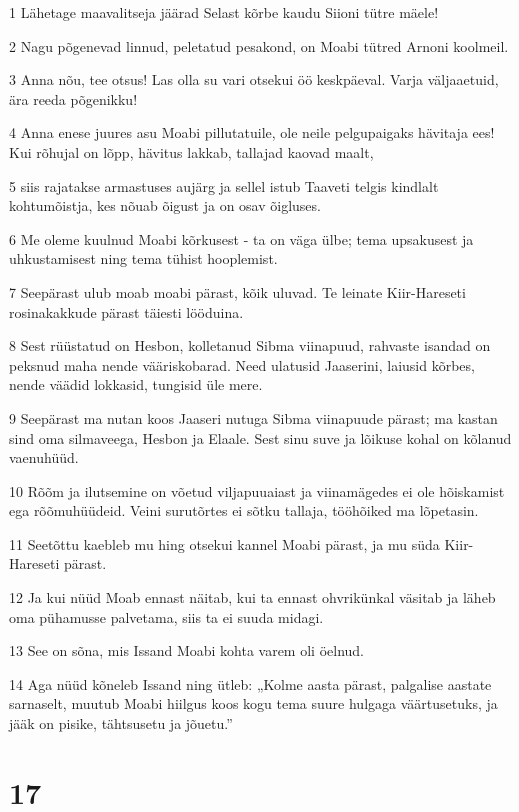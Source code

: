 \par 1 Lähetage maavalitseja jäärad Selast kõrbe kaudu Siioni tütre mäele!
\par 2 Nagu põgenevad linnud, peletatud pesakond, on Moabi tütred Arnoni koolmeil.
\par 3 Anna nõu, tee otsus! Las olla su vari otsekui öö keskpäeval. Varja väljaaetuid, ära reeda põgenikku!
\par 4 Anna enese juures asu Moabi pillutatuile, ole neile pelgupaigaks hävitaja ees! Kui rõhujal on lõpp, hävitus lakkab, tallajad kaovad maalt,
\par 5 siis rajatakse armastuses aujärg ja sellel istub Taaveti telgis kindlalt kohtumõistja, kes nõuab õigust ja on osav õigluses.
\par 6 Me oleme kuulnud Moabi kõrkusest - ta on väga ülbe; tema upsakusest ja uhkustamisest ning tema tühist hooplemist.
\par 7 Seepärast ulub moab moabi pärast, kõik uluvad. Te leinate Kiir-Hareseti rosinakakkude pärast täiesti lööduina.
\par 8 Sest rüüstatud on Hesbon, kolletanud Sibma viinapuud, rahvaste isandad on peksnud maha nende vääriskobarad. Need ulatusid Jaaserini, laiusid kõrbes, nende väädid lokkasid, tungisid üle mere.
\par 9 Seepärast ma nutan koos Jaaseri nutuga Sibma viinapuude pärast; ma kastan sind oma silmaveega, Hesbon ja Elaale. Sest sinu suve ja lõikuse kohal on kõlanud vaenuhüüd.
\par 10 Rõõm ja ilutsemine on võetud viljapuuaiast ja viinamägedes ei ole hõiskamist ega rõõmuhüüdeid. Veini surutõrtes ei sõtku tallaja, tööhõiked ma lõpetasin.
\par 11 Seetõttu kaebleb mu hing otsekui kannel Moabi pärast, ja mu süda Kiir-Hareseti pärast.
\par 12 Ja kui nüüd Moab ennast näitab, kui ta ennast ohvrikünkal väsitab ja läheb oma pühamusse palvetama, siis ta ei suuda midagi.
\par 13 See on sõna, mis Issand Moabi kohta varem oli öelnud.
\par 14 Aga nüüd kõneleb Issand ning ütleb: „Kolme aasta pärast, palgalise aastate sarnaselt, muutub Moabi hiilgus koos kogu tema suure hulgaga väärtusetuks, ja jääk on pisike, tähtsusetu ja jõuetu.”

\chapter{17}

